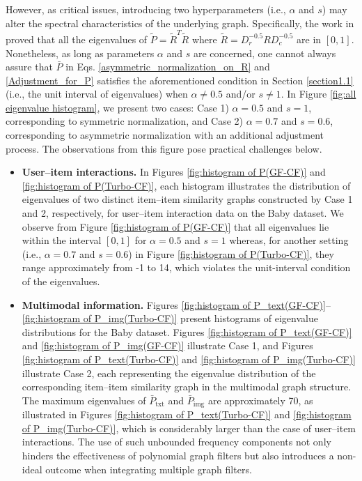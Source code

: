\documentclass[a4paper,fleqn]{cas-sc}
\renewcommand{\cite}{\citep}
\begin{document}
However, as critical issues, introducing two hyperparameters (i.e., $\alpha$ and $s$) may alter the spectral characteristics of the underlying graph. Specifically, the work in \cite{DBLP:conf/cikm/ShenWZSZLL21} proved that all the eigenvalues of $\tilde P = \tilde R^T \tilde R$ where $\tilde R = D_r^{-0.5}R D_c^{-0.5}$ are in $[0,1]$. Nonetheless, as long as parameters $\alpha$ and $s$ are concerned, one cannot always assure that $\bar P$ in Eqs. \eqref{asymmetric_normalization_on_R} and \eqref{Adjustment_for_P} satisfies the aforementioned condition in Section \ref{section1.1} (i.e., the unit interval of eigenvalues) when $\alpha \neq 0.5$ and/or $ s\neq 1$. In Figure \ref{fig:all eigenvalue histogram}, we present two cases: Case 1) $\alpha=0.5$ and $s=1$, corresponding to symmetric normalization, and Case 2) $\alpha=0.7$ and $s=0.6$, corresponding to asymmetric normalization with an additional adjustment process. The observations from this figure pose practical challenges below.

\begin{itemize}
    \item \textbf{User--item interactions.} In Figures \ref{fig:histogram of P(GF-CF)} and \ref{fig:histogram of P(Turbo-CF)}, each histogram illustrates the distribution of eigenvalues of two distinct item--item similarity graphs constructed by Case 1 and 2, respectively, for user--item interaction data on the Baby dataset. We observe from Figure \ref{fig:histogram of P(GF-CF)} that all eigenvalues lie within the interval $[0,1]$ for $\alpha=0.5$ and $s=1$ whereas, for another setting (i.e., $\alpha = 0.7$ and $s=0.6$) in Figure \ref{fig:histogram of P(Turbo-CF)}, they range approximately from -1 to 14, which violates the unit-interval condition of the eigenvalues.

    \item \textbf{Multimodal information.} Figures \ref{fig:histogram of P_text(GF-CF)}--\ref{fig:histogram of P_img(Turbo-CF)} present histograms of eigenvalue distributions for the Baby dataset. Figures \ref{fig:histogram of P_text(GF-CF)} and \ref{fig:histogram of P_img(GF-CF)} illustrate Case 1, and Figures \ref{fig:histogram of P_text(Turbo-CF)} and \ref{fig:histogram of P_img(Turbo-CF)} illustrate Case 2, each representing the eigenvalue distribution of the corresponding item–item similarity graph in the multimodal graph structure. The maximum eigenvalues of $\bar P_{\text{txt}}$ and $\bar P_{\text{img}}$ are approximately 70, as illustrated in Figures \ref{fig:histogram of P_text(Turbo-CF)} and \ref{fig:histogram of P_img(Turbo-CF)}, which is considerably larger than the case of user--item interactions. The use of such unbounded frequency components not only hinders the effectiveness of polynomial graph filters but also introduces a non-ideal outcome when integrating multiple graph filters.
\end{itemize}
\end{document}
